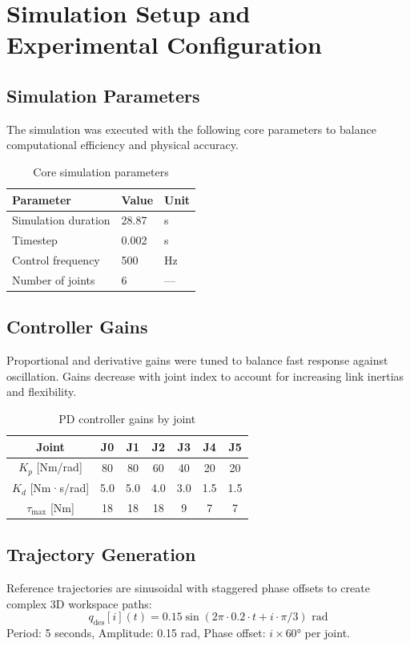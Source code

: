 \section{Simulation Setup and Experimental Configuration}

\subsection{Simulation Parameters}
The simulation was executed with the following core parameters to balance computational efficiency and physical accuracy.
\begin{table}[H]
    \centering
    \caption{Core simulation parameters}
    \begin{tabular}{lll}
        \toprule
        \textbf{Parameter} & \textbf{Value} & \textbf{Unit} \\
        \midrule
        Simulation duration & 28.87 & s \\
        Timestep & 0.002 & s \\
        Control frequency & 500 & Hz \\
        Number of joints & 6 & --- \\
        \bottomrule
    \end{tabular}
\end{table}

\subsection{Controller Gains}
Proportional and derivative gains were tuned to balance fast response against oscillation. Gains decrease with joint index to account for increasing link inertias and flexibility.
\begin{table}[H]
    \centering
    \caption{PD controller gains by joint}
    \begin{tabular}{ccccccc}
        \toprule
        \textbf{Joint} & J0 & J1 & J2 & J3 & J4 & J5 \\
        \midrule
        $K_p$ [Nm/rad] & 80 & 80 & 60 & 40 & 20 & 20 \\
        $K_d$ [Nm·s/rad] & 5.0 & 5.0 & 4.0 & 3.0 & 1.5 & 1.5 \\
        $\tau_{\max}$ [Nm] & 18 & 18 & 18 & 9 & 7 & 7 \\
        \bottomrule
    \end{tabular}
\end{table}

\subsection{Trajectory Generation}
Reference trajectories are sinusoidal with staggered phase offsets to create complex 3D workspace paths:
\begin{equation}
    q_{\text{des}}[i](t) = 0.15 \sin(2\pi \cdot 0.2 \cdot t + i \cdot \pi/3) \text{ rad}
\end{equation}
Period: 5 seconds, Amplitude: 0.15 rad, Phase offset: $i \times 60°$ per joint.

